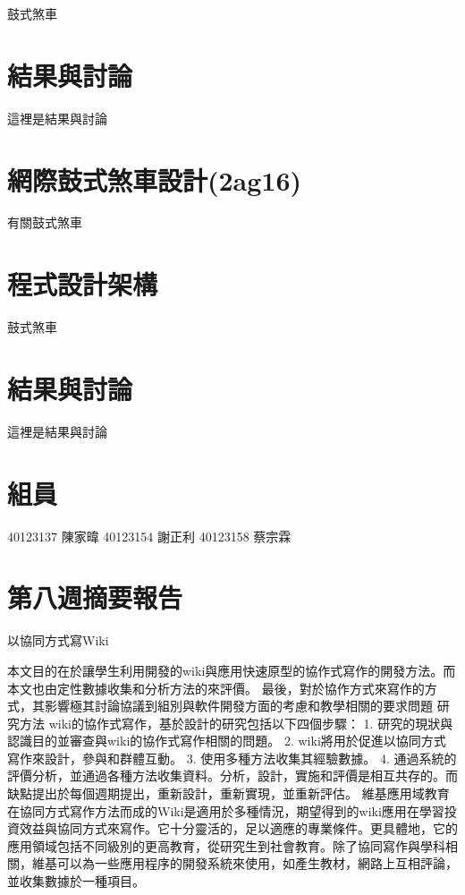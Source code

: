 \documentclass[]{article}
\begin{document}
鼓式煞車

\section{結果與討論}\label{ux7d50ux679cux8207ux8a0eux8ad6-2}

這裡是結果與討論

\section{網際鼓式煞車設計(2ag16)}\label{ux7db2ux969bux9f13ux5f0fux715eux8ecaux8a2dux8a082ag16}

有關鼓式煞車

\section{程式設計架構}\label{ux7a0bux5f0fux8a2dux8a08ux67b6ux69cb-3}

鼓式煞車

\section{結果與討論}\label{ux7d50ux679cux8207ux8a0eux8ad6-3}

這裡是結果與討論

\section{組員}\label{ux7d44ux54e1-4}

40123137 陳家暐 40123154 謝正利 40123158 蔡宗霖

\section{第八週摘要報告}\label{ux7b2cux516bux9031ux6458ux8981ux5831ux544a}

以協同方式寫Wiki

本文目的在於讓學生利用開發的wiki與應用快速原型的協作式寫作的開發方法。而本文也由定性數據收集和分析方法的來評價。
最後，對於協作方式來寫作的方式，其影響極其討論協議到組別與軟件開發方面的考慮和教學相關的要求問題
研究方法 wiki的協作式寫作，基於設計的研究包括以下四個步驟： 1.
研究的現狀與認識目的並審查與wiki的協作式寫作相關的問題。 2.
wiki將用於促進以協同方式寫作來設計，參與和群體互動。 3.
使用多種方法收集其經驗數據。 4.
通過系統的評價分析，並通過各種方法收集資料。分析，設計，實施和評價是相互共存的。而缺點提出於每個週期提出，重新設計，重新實現，並重新評估。
維基應用域教育在協同方式寫作方法而成的Wiki是適用於多種情況，期望得到的wiki應用在學習投資效益與協同方式來寫作。它十分靈活的，足以適應的專業條件。更具體地，它的應用領域包括不同級別的更高教育，從研究生到社會教育。除了協同寫作與學科相關，維基可以為一些應用程序的開發系統來使用，如產生教材，網路上互相評論，並收集數據於一種項目。
\end{document}
